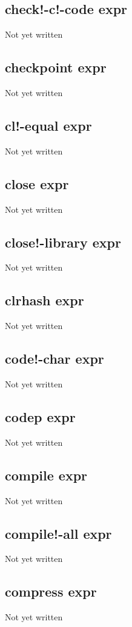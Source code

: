 \documentclass[a4paper,11pt]{article}
\begin{document}
\subsection{\ttfamily check!-c!-code expr}
Not yet written

\subsection{\ttfamily checkpoint expr}
Not yet written

\subsection{\ttfamily cl!-equal expr}
Not yet written

\subsection{\ttfamily close expr}
Not yet written

\subsection{\ttfamily close!-library expr}
Not yet written

\subsection{\ttfamily clrhash expr}
Not yet written

\subsection{\ttfamily code!-char expr}
Not yet written

\subsection{\ttfamily codep expr}
Not yet written

\subsection{\ttfamily compile expr}
Not yet written

\subsection{\ttfamily compile!-all expr}
Not yet written

\subsection{\ttfamily compress expr}
Not yet written
\end{document}
